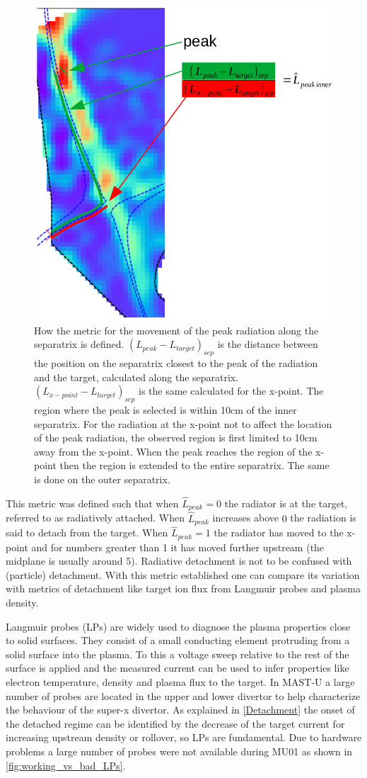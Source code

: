 \begin{figure}[!ht]
	\centering
	\includegraphics[trim={0 0 0 45},clip,width=0.6\linewidth]{Chapters/chapter2/figs/peak radiation tracking.png}
	\caption{How the metric for the movement of the peak radiation along the separatrix is defined. $(L_{peak}-L_{target})_{sep}$ is the distance between the position on the separatrix closest to the peak of the radiation and the target, calculated along the separatrix. $(L_{x-point}-L_{target})_{sep}$ is the same calculated for the x-point. The region where the peak is selected is within 10cm of the inner separatrix. For the radiation at the x-point not to affect the location of the peak radiation, the observed region is first limited to 10cm away from the x-point. When the peak reaches the region of the x-point then the region is extended to the entire separatrix. The same is done on the outer separatrix.}
	\label{fig:peka_track}
\end{figure}

This metric was defined such that when $\hat{L}_{peak}=0$ the radiator is at the target, referred to as radiatively attached. When $\hat{L}_{peak}$ increases above $0$ the radiation is said to detach from the target. When $\hat{L}_{peak}=1$ the radiator has moved to the x-point and for numbers greater than 1 it has moved further upstream (the midplane is usually around 5). Radiative detachment is not to be confused with (particle) detachment. With this metric established one can compare its variation with metrics of detachment like target ion flux from Langmuir probes and plasma density.

Langmuir probes (LPs) are widely used to diagnose the plasma properties close to solid surfaces. They consist of a small conducting element protruding from a solid surface into the plasma. To this a voltage sweep relative to the rest of the surface is applied and the measured current can be used to infer properties like electron temperature, density and plasma flux to the target. \cite{Hutchinson2002} In MAST-U a large number of probes are located in the upper and lower divertor to help characterize the behaviour of the super-x divertor.\cite{Lovell2017,Ryan2023} As explained in \autoref{Detachment} the onset of the detached regime can be identified by the decrease of the target current for increasing upstream density or rollover, so LPs are fundamental. Due to hardware problems a large number of probes were not available during MU01 as shown in \autoref{fig:working_vs_bad_LPs}.

